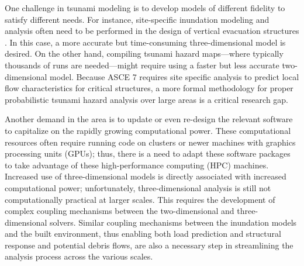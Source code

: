 One challenge in tsunami modeling is to develop models of different fidelity to satisfy different needs. For instance, site-specific inundation modeling and analysis often need to be performed in the design of vertical evacuation structures \citep{ash2015structures, gonzalez2013tsunami}. In this case, a more accurate but time-consuming three-dimensional model is desired. On the other hand, compiling tsunami hazard maps---where typically thousands of runs are needed---might require using a faster but less accurate two-dimensional model.  Because ASCE 7 requires site specific analysis to predict local flow characteristics for critical structures, a more formal methodology for proper probabilistic tsunami hazard analysis over large areas is a critical research gap.

Another demand in the area is to update or even re-design the relevant software to capitalize on the rapidly growing computational power. These computational resources often require running code on clusters or newer machines with graphics processing units (GPUs); thus, there is a need to adapt these software packages to take advantage of these high-performance computing (HPC) machines.  Increased use of three-dimensional models is directly associated with increased computational power; unfortunately, three-dimensional analysis is still not computationally practical at larger scales.  This requires the development of complex coupling mechanisms between the two-dimensional and three-dimensional solvers.  Similar coupling mechanisms between the inundation models and the built environment, thus enabling both load prediction and structural response and potential debris flows, are also a necessary step in streamlining the analysis process across the various scales.  

%
